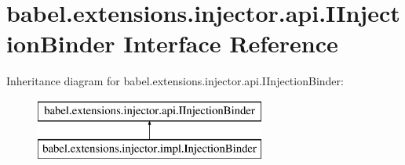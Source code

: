 \hypertarget{interfacebabel_1_1extensions_1_1injector_1_1api_1_1_i_injection_binder}{\section{babel.\-extensions.\-injector.\-api.\-I\-Injection\-Binder Interface Reference}
\label{interfacebabel_1_1extensions_1_1injector_1_1api_1_1_i_injection_binder}
}
Inheritance diagram for babel.\-extensions.\-injector.\-api.\-I\-Injection\-Binder\-:\begin{figure}[H]
\begin{center}
\leavevmode
\includegraphics[height=2.000000cm]{interfacebabel_1_1extensions_1_1injector_1_1api_1_1_i_injection_binder}
\end{center}
\end{figure}
